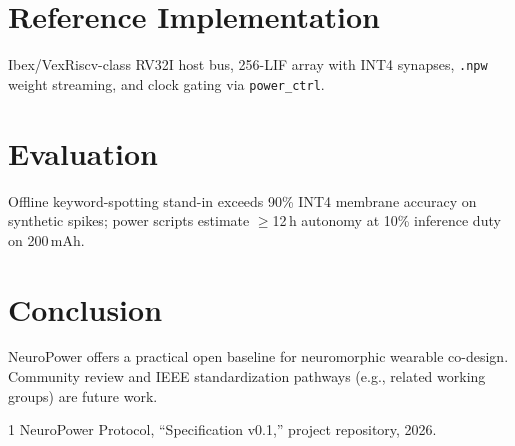 \documentclass[conference]{IEEEtran}
\begin{document}
\section{Reference Implementation}
Ibex/VexRiscv-class RV32I host bus, 256-LIF array with INT4 synapses, \texttt{.npw} weight streaming, and clock gating via \texttt{power\_ctrl}.

\section{Evaluation}
Offline keyword-spotting stand-in exceeds 90\% INT4 membrane accuracy on synthetic spikes; power scripts estimate $\geq$12\,h autonomy at 10\% inference duty on 200\,mAh.

\section{Conclusion}
NeuroPower offers a practical open baseline for neuromorphic wearable co-design. Community review and IEEE standardization pathways (e.g., related working groups) are future work.

\begin{thebibliography}{1}
 NeuroPower Protocol, ``Specification v0.1,'' project repository, 2026.
\end{thebibliography}
\end{document}
